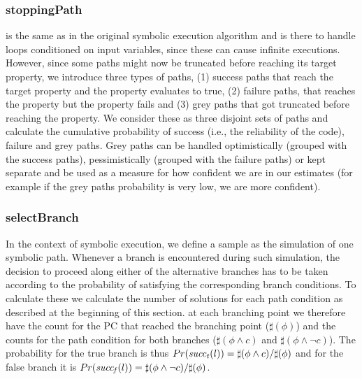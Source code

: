 \subsubsection{stoppingPath} is the same as in the original symbolic execution algorithm and is there to handle loops conditioned on input variables, since these can cause infinite executions. However, since some paths might now be truncated before reaching its target property, we introduce three types of paths, (1) success paths that reach the target property and the property evaluates to true, (2) failure paths, that reaches the property but the property fails and  (3) grey paths that got truncated before reaching the property. We consider these as three disjoint sets of paths and calculate the cumulative probability of success (i.e., the reliability of the code), failure and grey paths.  Grey paths can be handled optimistically (grouped with the success paths), pessimistically (grouped with the failure paths) or kept separate and be used as a measure for how confident we are in our estimates (for example if the grey paths probability is very low, we are more confident). 

\subsubsection{selectBranch}  In the context of symbolic execution, we define a sample as the
simulation of one symbolic path. Whenever a branch is encountered during such simulation, the decision to proceed along either of the alternative branches has to be taken according to the probability
of satisfying the corresponding branch conditions. To calculate these we calculate the number of solutions for each path condition as described at the beginning of this section. at each branching point we therefore have the count for the PC that reached the branching point ($\sharp(\phi)$) and the counts for the path condition for both branches ($\sharp(\phi \wedge c)$ and $\sharp(\phi \wedge \neg c)$). The probability for the true branch is thus $Pr(\mathit{succ_t}(l)) = \sharp(\phi \wedge c)/\sharp(\phi)$ and for the false branch it is $Pr(\mathit{succ_f}(l)) = \sharp(\phi \wedge \neg c)/\sharp(\phi)$.  



